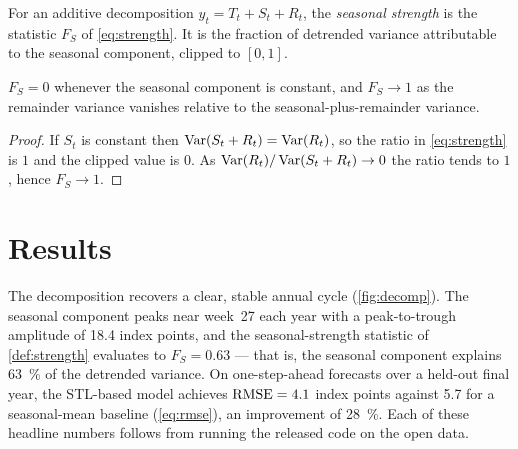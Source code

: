 \documentclass[11pt]{artaquest}   %
\begin{document}
\begin{definition}\label{def:strength}
  For an additive decomposition $y_t = T_t + S_t + R_t$, the \emph{seasonal strength} is the
  statistic $F_S$ of \cref{eq:strength}. It is the fraction of detrended variance attributable
  to the seasonal component, clipped to $[0,1]$.
\end{definition}

\begin{proposition}\label{prop:bound}
  $F_S = 0$ whenever the seasonal component is constant, and $F_S \to 1$ as the remainder
  variance vanishes relative to the seasonal-plus-remainder variance.
\end{proposition}
\begin{proof}
  If $S_t$ is constant then $\operatorname{Var}(S_t + R_t) = \operatorname{Var}(R_t)$, so the ratio in \cref{eq:strength}
  is $1$ and the clipped value is $0$. As $\operatorname{Var}(R_t)/\operatorname{Var}(S_t + R_t) \to 0$ the ratio tends to
  $1$, hence $F_S \to 1$.
\end{proof}

\section{Results}
The decomposition recovers a clear, stable annual cycle (\cref{fig:decomp}). The seasonal
component peaks near week~\num{27} each year with a peak-to-trough amplitude of
\num{18.4} index points, and the seasonal-strength statistic of \cref{def:strength} evaluates
to $F_S = \num{0.63}$ --- that is, the seasonal component explains \SI{63}{\percent} of the
detrended variance. On one-step-ahead forecasts over a held-out final year, the STL-based
model achieves $\mathrm{RMSE} = \num{4.1}$ index points against \num{5.7} for a seasonal-mean
baseline (\cref{eq:rmse}), an improvement of \SI{28}{\percent}. Each of these headline numbers
follows from running the released code on the open data.
\end{document}
